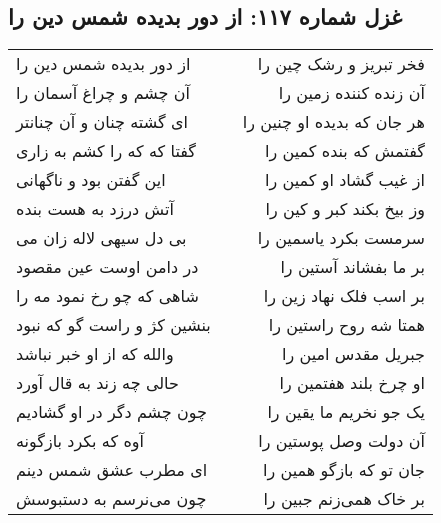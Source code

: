 \begin{center}
\section*{غزل شماره ۱۱۷: از دور بدیده شمس دین را}
\label{sec:0117}
\begin{longtable}{l p{0.5cm} r}
از دور بدیده شمس دین را
&&
فخر تبریز و رشک چین را
\\
آن چشم و چراغ آسمان را
&&
آن زنده کننده زمین را
\\
ای گشته چنان و آن چنانتر
&&
هر جان که بدیده او چنین را
\\
گفتا که که را کشم به زاری
&&
گفتمش که بنده کمین را
\\
این گفتن بود و ناگهانی
&&
از غیب گشاد او کمین را
\\
آتش درزد به هست بنده
&&
وز بیخ بکند کبر و کین را
\\
بی دل سیهی لاله زان می
&&
سرمست بکرد یاسمین را
\\
در دامن اوست عین مقصود
&&
بر ما بفشاند آستین را
\\
شاهی که چو رخ نمود مه را
&&
بر اسب فلک نهاد زین را
\\
بنشین کژ و راست گو که نبود
&&
همتا شه روح راستین را
\\
والله که از او خبر نباشد
&&
جبریل مقدس امین را
\\
حالی چه زند به قال آورد
&&
او چرخ بلند هفتمین را
\\
چون چشم دگر در او گشادیم
&&
یک جو نخریم ما یقین را
\\
آوه که بکرد بازگونه
&&
آن دولت وصل پوستین را
\\
ای مطرب عشق شمس دینم
&&
جان تو که بازگو همین را
\\
چون می‌نرسم به دستبوسش
&&
بر خاک همی‌زنم جبین را
\\
\end{longtable}
\end{center}

